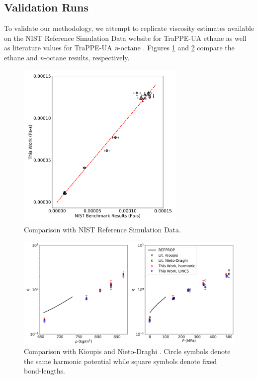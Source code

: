 \documentclass[preprint,review,12pt]{elsarticle}
\begin{document}
	
	\subsection{Validation Runs}
	
    To validate our methodology, we attempt to replicate viscosity estimates available on the NIST Reference Simulation Data website for TraPPE-UA ethane as well as literature values for TraPPE-UA \textit{n}-octane \cite{Nieto2006}. Figures \ref{fig:validation_runs} and \ref{fig:validation_runs2} compare the ethane and \textit{n}-octane results, respectively.
    
    
    \begin{figure}[htb!]
    	\centering
    	\includegraphics[width=3.2in]{NIST_ethane_TraPPE_validation.pdf}
    	\caption{Comparison with NIST Reference Simulation Data.}
    	\label{fig:validation_runs}
    \end{figure} 

    \begin{figure}[htb!]
		\centering
		\includegraphics[width=6.4in]{validation_TraPPE_octane.png}
		\caption{Comparison with Kioupis \cite{Kioupis2000} and Nieto-Draghi \cite{Nieto2006}. Circle symbols denote the same harmonic potential while square symbols denote fixed bond-lengths.}
		\label{fig:validation_runs2}
	\end{figure}
    
\end{document}
